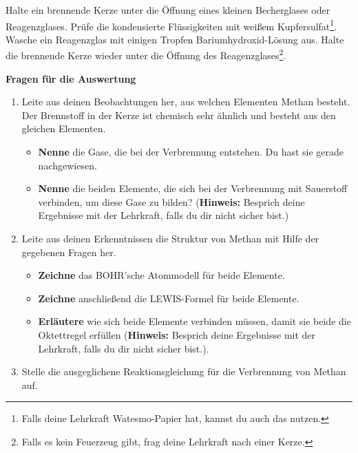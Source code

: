 \documentclass{scrartcl}  %
\begin{document}
\begin{tcolorbox}
			Halte ein brennende Kerze unter die Öffnung eines kleinen Becherglases oder Reagenzglases. Prüfe die kondensierte Flüssigkeiten mit weißem Kupfersulfat\footnote{Falls deine Lehrkraft Watesmo-Papier hat, kannst du auch das nutzen.}. \newline 
			Wasche ein Reagenzglas mit einigen Tropfen Bariumhydroxid-Lösung aus. Halte die brennende Kerze wieder unter die Öffnung des Reagenzglases\footnote{Falls es kein Feuerzeug gibt, frag deine Lehrkraft nach einer Kerze.}.
			\vspace{0.7cm}  %
		\end{tcolorbox}
	
		\vspace{0.5cm}
		
		\noindent \textbf{Fragen für die Auswertung}
		
		\begin{enumerate}
			\item Leite aus deinen Beobachtungen her, aus welchen Elementen Methan besteht. Der Brennstoff in der Kerze ist chemisch sehr ähnlich und besteht aus den gleichen Elementen.
				\begin{itemize}
					\item \textbf{Nenne} die Gase, die bei der Verbrennung entstehen. Du hast sie gerade nachgewiesen.
					\item \textbf{Nenne} die beiden Elemente, die sich bei der Verbrennung mit Sauerstoff  verbinden, um diese Gase zu bilden? (\textbf{Hinweis:} Besprich deine Ergebnisse mit der Lehrkraft, falls du dir nicht sicher bist.)
				\end{itemize}
			\item Leite aus deinen Erkenntnissen die Struktur von Methan mit Hilfe der gegebenen Fragen her.
				\begin{itemize}
					\item \textbf{Zeichne} das BOHR'sche Atommodell für beide Elemente.
					\item \textbf{Zeichne} anschließend die LEWIS-Formel für beide Elemente.
					\item \textbf{Erläutere} wie sich beide Elemente verbinden müssen, damit sie beide die Oktettregel erfüllen (\textbf{Hinweis:} Besprich deine Ergebnisse mit der Lehrkraft, falls du dir nicht sicher bist.).
				\end{itemize}
			\item Stelle die ausgeglichene Reaktionsgleichung für die Verbrennung von Methan auf.
		\end{enumerate}
	
\end{document}
